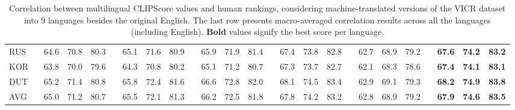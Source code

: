\begin{table*}[t!]
{\begin{tabular}{l c c c   c   c c c   c   c c c   c   c c c   c   c c c    c   c c c }
RUS      & 64.6 & 70.8 & 80.3 &  & 65.1 & 71.6 & 80.9 &  & 65.9 & 71.9 & 81.4 &  & 67.4 & 73.8 & 82.8 &  & 62.7 & 68.9 & 79.2 &  & \textbf{67.6} & \textbf{74.2} & \textbf{83.2}     \\
KOR      & 63.8 & 70.0 & 79.6 &  & 64.3 & 70.8 & 80.2 &  & 65.1 & 71.2 & 80.7 &  & 67.3 & 73.7 & 82.7 &  & 62.1 & 68.3 & 78.6 &  & \textbf{67.4} & \textbf{74.1} & \textbf{83.1}     \\
DUT      & 65.2 & 71.4 & 80.8 &  & 65.8 & 72.4 & 81.6 &  & 66.6 & 72.8 & 82.0 &  & 68.1 & 74.5 & 83.4 &  & 62.9 & 69.1 & 79.3 &  & \textbf{68.2} & \textbf{74.9} & \textbf{83.8}       \\ \hline 
AVG~~    & 65.0 & 71.2 & 80.7 &  & 65.5 & 72.1 & 81.3 &  & 66.2 & 72.5 & 81.8 &  & 67.8 & 74.2 & 83.2 &  & 62.8 & 68.9 & 79.2 &  & \textbf{67.9} & \textbf{74.6} & \textbf{83.5}      \\

\hline 
\end{tabular}
}
\caption{Correlation between multilingual CLIPScore values and human rankings, considering machine-translated versions of the VICR dataset into 9 languages besides the original English. The last row presents macro-averaged correlation results across all the languages (including English). \textbf{Bold} values signify the best score per language.}
\label{tab:multilingual-results-2}
\end{table*}